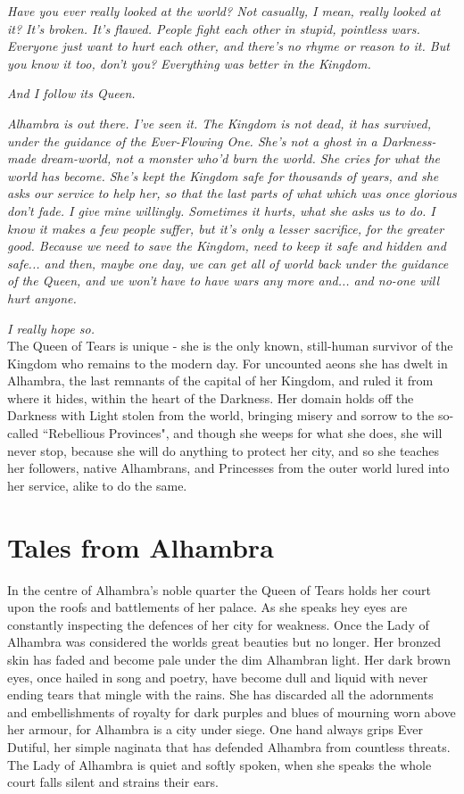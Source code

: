 \noindent\textit{Have you ever really looked at the world? Not casually, I mean, really looked at it? It's broken. It's flawed. People fight each other in stupid, pointless wars. Everyone just want to hurt each other, and there's no rhyme or reason to it. But you know it too, don't you? Everything was better in the Kingdom.}

\textit{And I follow its Queen. }

\textit{Alhambra is out there. I've seen it. The Kingdom is not dead, it has survived, under the guidance of the Ever-Flowing One. She's not a ghost in a Darkness-made dream-world, not a monster who'd burn the world. She cries for what the world has become. She's kept the Kingdom safe for thousands of years, and she asks our service to help her, so that the last parts of what which was once glorious don't fade. I give mine willingly. Sometimes it hurts, what she asks us to do. I know it makes a few people suffer, but it's only a lesser sacrifice, for the greater good. Because we need to save the Kingdom, need to keep it safe and hidden and safe... and then, maybe one day, we can get all of world back under the guidance of the Queen, and we won't have to have wars any more and... and no-one will hurt anyone. }

\textit{I really hope so. }\\

\noindent The Queen of Tears is unique - she is the only known, still-human survivor of the Kingdom who remains to the modern day. For uncounted aeons she has dwelt in Alhambra, the last remnants of the capital of her Kingdom, and ruled it from where it hides, within the heart of the Darkness. Her domain holds off the Darkness with Light stolen from the world, bringing misery and sorrow to the so-called \textquotedblleft Rebellious Provinces", and though she weeps for what she does, she will never stop, because she will do anything to protect her city, and so she teaches her followers, native Alhambrans, and Princesses from the outer world lured into her service, alike to do the same. 

\section*{Tales from Alhambra}

In the centre of Alhambra's noble quarter the Queen of Tears holds her court upon the roofs and battlements of her palace. As she speaks hey eyes are constantly inspecting the defences of her city for weakness. Once the Lady of Alhambra was considered the worlds great beauties but no longer. Her bronzed skin has faded and become pale under the dim Alhambran light. Her dark brown eyes, once hailed in song and poetry, have become dull and liquid with never ending tears that mingle with the rains. She has discarded all the adornments and embellishments of royalty for dark purples and blues of mourning worn above her armour, for Alhambra is a city under siege. One hand always grips Ever Dutiful, her simple naginata that has defended Alhambra from countless threats. The Lady of Alhambra is quiet and softly spoken, when she speaks the whole court falls silent and strains their ears.

